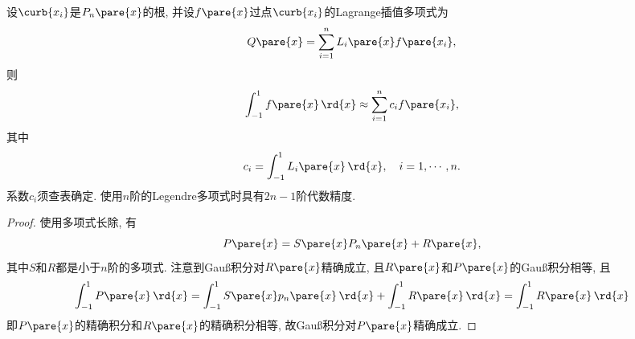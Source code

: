 \documentclass{ctexart}
\begin{document}
\begin{theorem}[Gau\ss 积分]
    设$\curb{x_i}$是$P_n\pare{x}$的根, 并设$f\pare{x}$过点$\curb{x_i}$的Lagrange插值多项式为
    \[ Q\pare{x} = \sum_{i=1}^n L_i\pare{x}f\pare{x_i}, \]
    则
    \[ \int_{-1}^1 f\pare{x}\,\rd{x} \approx \sum_{i=1}^n c_i f\pare{x_i}, \]
    其中
    \[ c_i = \int_{-1}^1 L_i\pare{x}\,\rd{x},\quad i = 1,\cdots,n. \]
    系数$c_i$须查表确定. 使用$n$阶的Legendre多项式时具有$2n-1$阶代数精度.
\end{theorem}
\begin{proof}
    使用多项式长除, 有
    \[ P\pare{x} = S\pare{x}P_n\pare{x} + R\pare{x}, \]
    其中$S$和$R$都是小于$n$阶的多项式. 注意到Gau\ss 积分对$R\pare{x}$精确成立, 且$R\pare{x}$和$P\pare{x}$的Gau\ss 积分相等, 且
    \[ \int_{-1}^1 P\pare{x}\,\rd{x} = \int_{-1}^1 S\pare{x}p_n\pare{x}\,\rd{x} + \int_{-1}^1 R\pare{x}\,\rd{x} = \int_{-1}^1 R\pare{x}\,\rd{x} \]
    即$P\pare{x}$的精确积分和$R\pare{x}$的精确积分相等, 故Gau\ss 积分对$P\pare{x}$精确成立.
\end{proof}



\end{document}
